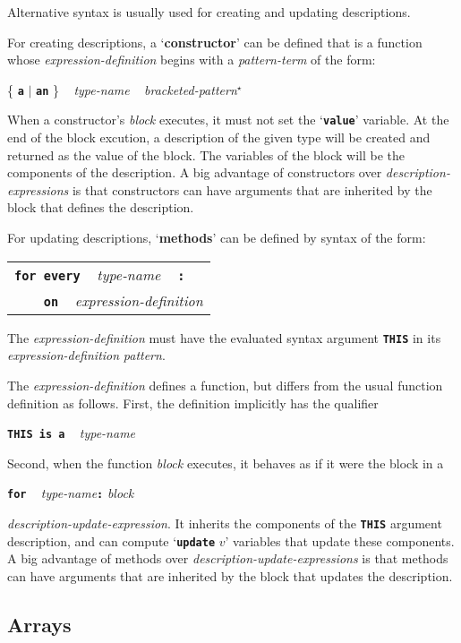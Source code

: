 \documentclass[12pt]{article}
\newcommand{\TT}[1]{{\tt \bfseries #1}}
\newcommand{\key}[1]{{\rm \bfseries #1}}
\newcommand{\EOL}{\penalty \exhyphenpenalty}
\newcommand{\STAR}{{\Large $^\star$}}
\begin{document}
Alternative syntax is usually used for creating and updating descriptions.

For creating descriptions, a `\key{constructor}' can be defined that
is a function whose {\em expression-definition} begins with a
{\em pattern-term} of the form:
\begin{center}
\{ \TT{a} $|$ \TT{an} \} ~ {\em type-name} ~ {\em bracketed-pattern}\STAR{}
\end{center}

When a constructor's {\em block} executes, it must not set the
`\TT{value}' variable.  At the end of the block excution, a description
of the given type will be created and returned as the value of the
block.  The variables of the block will be the components of the
description.  A big advantage of constructors over {\em description-expressions}
is that constructors can have arguments that are inherited by the block
that defines the description.

For updating descriptions, `\key{methods}' can be defined by syntax
of the form:
\begin{center}
\begin{tabular}{l}
\TT{for every} ~ {\em type-name} ~ \TT{:} \\
\verb|    |\TT{on} ~ {\em expression-definition}
\end{tabular}
\end{center}

The {\em expression-definition} must have the evaluated syntax argument
\TT{THIS} in its {\em expression-\EOL de\-fi\-ni\-tion} {\em pattern}.  

The {\em expression-definition} defines a function, but differs from
the usual function definition as follows.  First, the definition
implicitly has the qualifier
\begin{center}
\TT{THIS is a} ~ {\em type-name}
\end{center}
Second, when the function {\em block} executes, it behaves as if it
were the block in a
\begin{center}
\TT{for} ~ {\em type-name}\TT{:} {\em block}
\end{center}
{\em description-update-expression}.  It inherits the components of
the \TT{THIS} argument description, and can compute `\TT{update} $v$'
variables that update these components.  A big advantage of
methods over {\em description-update-expressions} is that methods
can have arguments that are inherited by the block that updates
the description.

\subsection{Arrays}
\label{Arrays}
\end{document}
